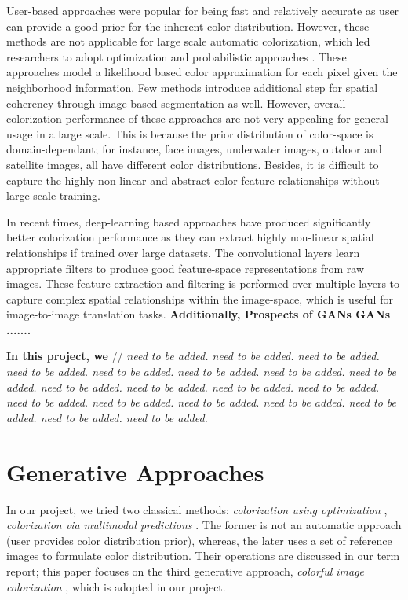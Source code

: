 \documentclass[10pt]{article}
\begin{document}
User-based approaches \cite{levin2004colorization, konushin2006interactive, reinhard2001color, vrhel1992color} were popular for being fast and relatively accurate as user can provide a good prior for the inherent color distribution. However, these methods are not applicable for large scale automatic colorization, which led researchers to adopt optimization and probabilistic approaches \cite{charpiat2008automatic, bugeau2014variational, lagodzinski2008digital}. 
These approaches model a likelihood based color approximation for each pixel given the neighborhood information. 
Few methods introduce additional step for spatial coherency through image based segmentation as well. However, overall colorization performance of these approaches are not very appealing \cite{deshpande2015learning} for general usage in a large scale. This is because the prior distribution of color-space is domain-dependant; for instance, face images, underwater images, outdoor and satellite images, all have different color distributions. Besides, it is difficult to capture the highly non-linear and abstract color-feature relationships without large-scale training. 

In recent times, deep-learning based approaches \cite{zhang2016colorful, cheng2015deep, varga2016fully, li2017watergan} have produced significantly better colorization performance as they can extract highly non-linear spatial relationships if trained over large datasets. 
The convolutional layers learn appropriate filters to produce good feature-space representations from raw images. These feature extraction and filtering is performed over multiple layers 
to capture complex spatial relationships within the image-space, which is useful for image-to-image translation tasks. \textbf{Additionally,  Prospects of GANs GANs .......}

\textbf{In this project, we } 
// \textit{need to be added. need to be added. need to be added. need to be added. need to be added. need to be added. need to be added. need to be added.
need to be added. need to be added. need to be added. need to be added. need to be added. need to be added.
need to be added. need to be added. need to be added. need to be added. need to be added.}  

\section{Generative Approaches}
In our project, we tried two classical methods: \textit{colorization using optimization} \cite{levin2004colorization}, \textit{colorization via multimodal predictions} \cite{charpiat2008automatic}. The former is not an automatic approach (user provides color distribution prior), whereas, the later uses a set of reference images to formulate color distribution. Their operations are discussed in our term report; this paper focuses on the third generative approach, \textit{colorful image colorization} \cite{zhang2016colorful}, which is adopted in our project. 
\end{document}
